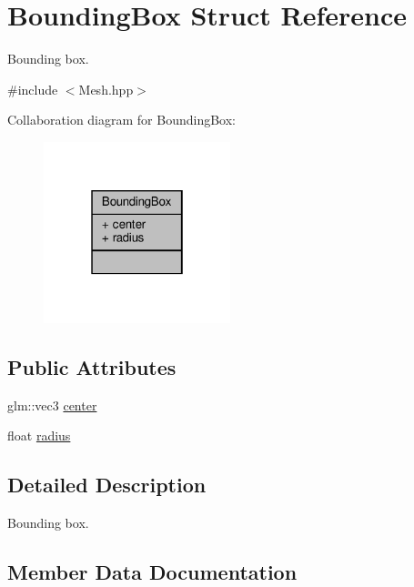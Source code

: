 \hypertarget{struct_bounding_box}{}\section{Bounding\+Box Struct Reference}
\label{struct_bounding_box}


Bounding box.  




{\ttfamily \#include $<$Mesh.\+hpp$>$}



Collaboration diagram for Bounding\+Box\+:
\nopagebreak
\begin{figure}[H]
\begin{center}
\leavevmode
\includegraphics[width=154pt]{struct_bounding_box__coll__graph}
\end{center}
\end{figure}
\subsection*{Public Attributes}
\begin{DoxyCompactItemize}
\item 
glm\+::vec3 \hyperlink{struct_bounding_box_a4581e8476026990423d14fdd5c94b74f}{center}
\item 
float \hyperlink{struct_bounding_box_ab85c564601bd9907b4e1cd88b9e11aa2}{radius}
\end{DoxyCompactItemize}


\subsection{Detailed Description}
Bounding box. 

\subsection{Member Data Documentation}
\mbox{\label{struct_bounding_box_a4581e8476026990423d14fdd5c94b74f}} 
